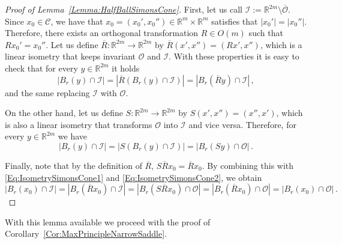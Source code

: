 \documentclass[12pt,reqno]{amsart}
\theoremstyle{definition}
\theoremstyle{remark}
\newcommand{\con}[1]{\mathbb{#1}}
\newcommand{\R}{\con{R}} %
\newcommand{\ccal}{\mathscr{C}}
\newcommand{\ical}{\mathcal{I}}
\newcommand{\ocal}{\mathcal{O}}
\numberwithin{equation}{section}
\begin{document}
\begin{proof}[Proof of Lemma~\ref{Lemma:HalfBallSimonsCone}]
First, let us call $\ical := \R^{2m}\setminus \overline{\ocal}$. Since $x_0\in \ccal$, we have that $x_0 = (x_0',x_0'')\in \R^m \times \R^m$ satisfies that $|x_0'|=|x_0''|$. Therefore, there exists an orthogonal transformation $R\in O(m)$ such that $R  x_0' = x_0''$. Let us define $\overline{R}:\R^{2m}\to\R^{2m}$ by $\overline{R}(x',x'') = (R x',x'')$, which is a linear isometry that keeps invariant $\ocal$ and $\ical$. With these properties it is easy to check that for every $y\in \R^{2m}$ it holds
\begin{equation}
\label{Eq:IsometrySimonsCone1}
|B_r(y)\cap \ical| = |\overline{R} \left( B_r(y)\cap \ical\right)| = | B_r(\overline{R}y) \cap \ical |\,,
\end{equation}
and the same replacing $\ical$ with $\ocal$.

On the other hand, let us define $S:\R^{2m}\to\R^{2m}$ by $S(x',x'') = (x'',x')$, which is also a linear isometry that transforms $\ocal$ into $\ical$ and vice versa. Therefore, for every $y\in \R^{2m}$ we have
\begin{equation}
\label{Eq:IsometrySimonsCone2}
|B_r(y)\cap \ical| = |S \left( B_r(y)\cap \ical\right)| = | B_r(Sy) \cap \ocal |\,.
\end{equation}

Finally, note that by the definition of $\overline{R}$, $S\overline{R} x_0 = \overline{R} x_0$. By combining this with \eqref{Eq:IsometrySimonsCone1} and \eqref{Eq:IsometrySimonsCone2}, we obtain
$$ |B_r(x_0)\cap \ical| = | B_r(\overline{R}x_0) \cap \ical | = | B_r(S\overline{R}x_0) \cap \ocal | = | B_r(\overline{R}x_0) \cap \ocal | = |B_r(x_0)\cap \ocal|\,. $$
\end{proof}

With this lemma available we proceed with the proof of Corollary~\ref{Cor:MaxPrincipleNarrowSaddle}.
\end{document}
